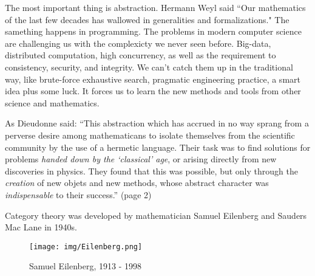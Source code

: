 \documentclass{article}
\begin{document}
The most important thing is abstraction. Hermann Weyl said ``Our mathematics of the last few decades has wallowed in generalities and formalizations." The samething happens in programming. The problems in modern computer science are challenging us with the complexicty we never seen before. Big-data, distributed computation, high concurrency, as well as the requirement to consistency, security, and integrity. We can't catch them up in the traditional way, like brute-force exhaustive search, pragmatic engineering practice, a smart idea plus some luck. It forces us to learn the new methods and tools from other science and mathematics.

As Dieudonne said: ``This abstraction which has accrued in no way sprang from a perverse desire among mathematicans to isolate themselves from the scientific community by the use of a hermetic language. Their task was to find solutions for problems {\em handed down by the `classical' age}, or arising directly from new discoveries in physics. They found that this was possible, but only through the {\em creation} of new objets and new methods, whose abstract character was {\em indispensable} to their success.'' \cite{Dieudonne1987}(page 2)

Category theory was developed by mathematician Samuel Eilenberg and Sauders Mac Lane in 1940s.

\begin{wrapfigure}{R}{0.3\textwidth}
 \centering
 \texttt{[image: img/Eilenberg.png]}
 \captionsetup{labelformat=empty}
 \caption{Samuel Eilenberg, 1913 - 1998}
 \label{fig:Eilenberg}
\end{wrapfigure}
\end{document}
